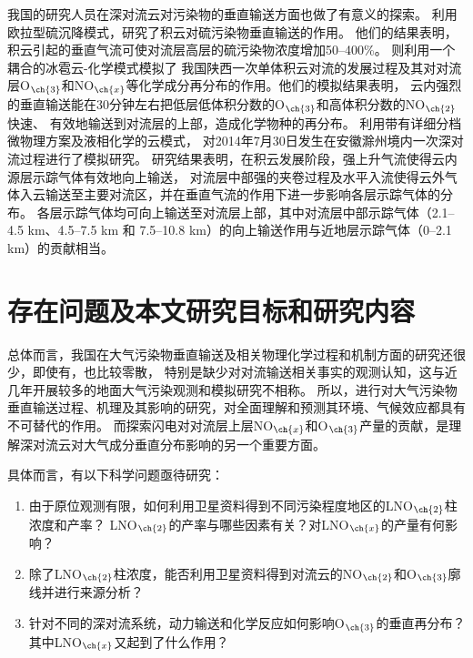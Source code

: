 我国的研究人员在深对流云对污染物的垂直输送方面也做了有意义的探索。
\citet{GaoHuiWang.1998}利用欧拉型硫沉降模式，研究了积云对硫污染物垂直输送的作用。
他们的结果表明，积云引起的垂直气流可使对流层高层的硫污染物浓度增加50--400\%。
\citet{LiBing.1999,LiBing.2001}则利用一个耦合的冰雹云-化学模式模拟了
我国陕西一次单体积云对流的发展过程及其对对流层O$_{\ch{3}}$和NO$_{\ch{x}}$等化学成分再分布的作用。他们的模拟结果表明，
云内强烈的垂直输送能在30分钟左右把低层低体积分数的O$_{\ch{3}}$和高体积分数的NO$_{\ch{2}}$快速、
有效地输送到对流层的上部，造成化学物种的再分布。
\citet{HuJiaYing.2019}利用带有详细分档微物理方案及液相化学的云模式，
对2014年7月30日发生在安徽滁州境内一次深对流过程进行了模拟研究。
研究结果表明，在积云发展阶段，强上升气流使得云内源层示踪气体有效地向上输送，
对流层中部强的夹卷过程及水平入流使得云外气体入云输送至主要对流区，并在垂直气流的作用下进一步影响各层示踪气体的分布。
各层示踪气体均可向上输送至对流层上部，其中对流层中部示踪气体（2.1--4.5 km、4.5--7.5 km 和 7.5--10.8 km）的向上输送作用与近地层示踪气体（0--2.1 km）的贡献相当。




\section{存在问题及本文研究目标和研究内容}

总体而言，我国在大气污染物垂直输送及相关物理化学过程和机制方面的研究还很少，即使有，也比较零散，
特别是缺少对对流输送相关事实的观测认知，这与近几年开展较多的地面大气污染观测和模拟研究不相称。
所以，进行对大气污染物垂直输送过程、机理及其影响的研究，对全面理解和预测其环境、气候效应都具有不可替代的作用。
而探索闪电对对流层上层NO$_{\ch{x}}$和O$_{\ch{3}}$产量的贡献，是理解深对流云对大气成分垂直分布影响的另一个重要方面。

具体而言，有以下科学问题亟待研究：

\begin{enumerate}[label=（\arabic*）, labelindent=\parindent, nosep, leftmargin=0pt, widest=0, itemindent=*, topsep=0pt, partopsep=0pt, parsep=0pt]

\item 由于原位观测有限，如何利用卫星资料得到不同污染程度地区的LNO$_{\ch{2}}$柱浓度和产率？
LNO$_{\ch{2}}$的产率与哪些因素有关？对LNO$_{\ch{x}}$的产量有何影响？

\item 除了LNO$_{\ch{2}}$柱浓度，能否利用卫星资料得到对流云的NO$_{\ch{2}}$和O$_{\ch{3}}$廓线并进行来源分析？

\item 针对不同的深对流系统，动力输送和化学反应如何影响O$_{\ch{3}}$的垂直再分布？其中LNO$_{\ch{x}}$又起到了什么作用？

\end{enumerate}

